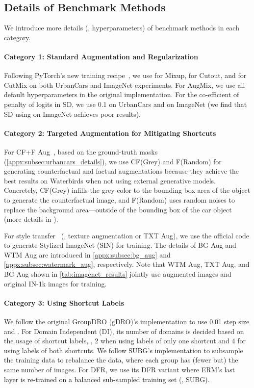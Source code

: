 \documentclass[10pt,twocolumn,letterpaper]{article}
\begin{document}
\subsection{Details of Benchmark Methods}
\label{appx:subsec:benchmark_methods_details}

We introduce more details (\eg, hyperparameters) of benchmark methods in each category.

\paragraph{Category 1: Standard Augmentation and Regularization} Following PyTorch's new training recipe~\cite{vryniotis2021PyTorchBlogHow}, we use  for Mixup,  for Cutout, and  for CutMix on both UrbanCars and ImageNet experiments. For AugMix, we use all default hyperparameters in the original implementation. For the co-efficient of  penalty of logits in SD, we use 0.1  on UrbanCars and  on ImageNet (we find that SD using  on ImageNet achieves poor results).

\paragraph{Category 2: Targeted Augmentation for Mitigating Shortcuts} For CF+F Aug~\cite{chang2021IEEECVFConf.Comput.Vis.PatternRecognit.CVPRRobust}, based on the ground-truth masks (\cf \cref{appx:subsec:urbancars_details}), we use CF(Grey) and F(Random) for generating counterfactual and factual augmentations because they achieve the best results on Waterbirds when not using external generative models. Concretely, CF(Grey) infills the grey color to the bounding box area of the object to generate the counterfactual image, and F(Random) uses random noises to replace the background area---outside of the bounding box of the car object (more details in \cite{chang2021IEEECVFConf.Comput.Vis.PatternRecognit.CVPRRobust}).

For style transfer~\cite{geirhos2019Int.Conf.Learn.Represent.ImageNettrained} (\ie, texture augmentation or TXT Aug), we use the official code to generate Stylized ImageNet (SIN) for training. The details of BG Aug and WTM Aug are introduced in \cref{appx:subsec:bg_aug} and \cref{appx:subsec:watermark_aug}, respectively. Note that WTM Aug, TXT Aug, and BG Aug shown in \cref{tab:imagenet_results} jointly use augmented images and original IN-1k images for training.

\paragraph{Category 3: Using Shortcut Labels} We follow the original GroupDRO (gDRO)'s implementation to use 0.01 step size and .
For Domain Independent (DI), its number of domains is decided based on the usage of shortcut labels, \ie, 2 when using labels of only one shortcut and 4 for using labels of both shortcuts. We follow SUBG's implementation to subsample the training data to rebalance the data, where each group has (fewer but) the same number of images. For DFR, we use its DFR variant where ERM's last layer is re-trained on a balanced sub-sampled training set (\ie, SUBG).
\end{document}
